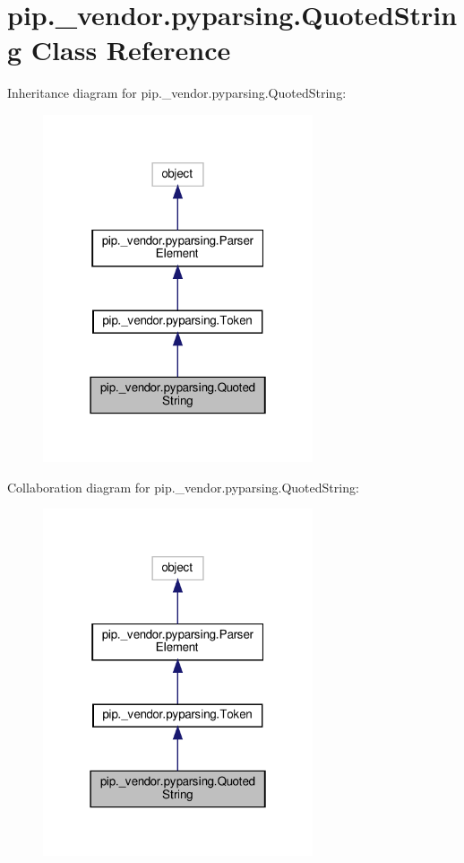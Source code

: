 \hypertarget{classpip_1_1__vendor_1_1pyparsing_1_1QuotedString}{}\section{pip.\+\_\+vendor.\+pyparsing.\+Quoted\+String Class Reference}
\label{classpip_1_1__vendor_1_1pyparsing_1_1QuotedString}


Inheritance diagram for pip.\+\_\+vendor.\+pyparsing.\+Quoted\+String\+:
\nopagebreak
\begin{figure}[H]
\begin{center}
\leavevmode
\includegraphics[width=226pt]{classpip_1_1__vendor_1_1pyparsing_1_1QuotedString__inherit__graph}
\end{center}
\end{figure}


Collaboration diagram for pip.\+\_\+vendor.\+pyparsing.\+Quoted\+String\+:
\nopagebreak
\begin{figure}[H]
\begin{center}
\leavevmode
\includegraphics[width=226pt]{classpip_1_1__vendor_1_1pyparsing_1_1QuotedString__coll__graph}
\end{center}
\end{figure}
